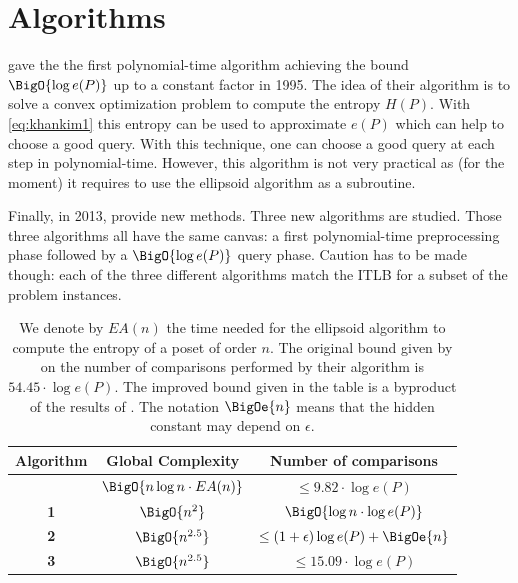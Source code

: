 
\section{Algorithms}


\citet*{kahn:1995} gave the the first polynomial-time algorithm achieving the
bound $\BigO{\log e(P)}$ up to a constant factor in 1995. The idea of their
algorithm is to solve a convex optimization problem to compute the entropy
\(H(P)\). With \ref{eq:khankim1} this entropy can be used to approximate
\(e(P)\) which can help to choose a good query. With this technique, one can
choose a good query at each step in polynomial-time. However, this algorithm
is not very practical as (for the moment) it requires to use the ellipsoid
algorithm as a subroutine.

Finally, in 2013, \citet*{cardinal:2013} provide new methods. Three new
algorithms are studied. Those three algorithms all have the same canvas: a
first polynomial-time preprocessing phase followed by a $\BigO{\log e(P)}$
query phase. Caution has to be made though: each of the three different
algorithms match the ITLB for a subset of the problem instances.

\begin{table}
	\begin{center}
	\caption{We denote by $E A(n)$ the time needed for the ellipsoid algorithm
to compute the entropy of a poset of order $n$. The original bound given by
\citet*{kahn:1995} on the number of comparisons performed by their algorithm is
$54.45 \cdot \log e(P)$. The improved bound given in the table is a byproduct
of the results of \citet*{cardinal:2013}. The notation $\BigOe{n}$ means
that the hidden constant may depend on $\epsilon$.}
	\label{tree:supi:table/jcardin}
	\begin{tabular}{|c|c|c|}

	\hline
	Algorithm & Global Complexity & Number of comparisons\\\hline\hline
	\citet*{kahn:1995} & $\BigO{n \log n \cdot E A(n)}$ & $\leq 9.82 \cdot \log e(P)$\\\hline\hline
	\citet*{cardinal:2013} \textbf{1} & $ \BigO{n^{2}} $ & $\BigO{\log n \cdot \log e(P)}$ \\\hline
	\citet*{cardinal:2013} \textbf{2} & $ \BigO{n^{2.5}} $ & $\leq (1 + \epsilon) \log e(P) + \BigOe{n}$ \\\hline
	\citet*{cardinal:2013} \textbf{3} & $ \BigO{n^{2.5}} $ & $\leq 15.09 \cdot \log e(P)$ \\\hline

	\end{tabular}
	\end{center}
\end{table}



